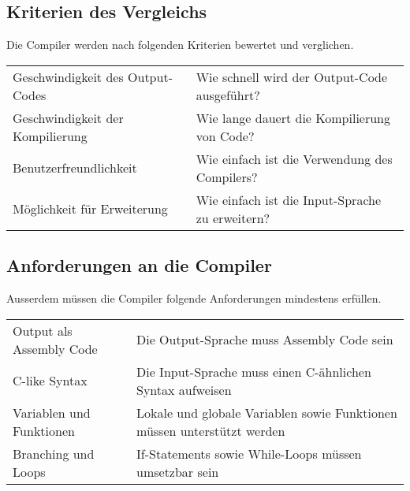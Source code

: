 \subsection{Kriterien des Vergleichs}
Die Compiler werden nach folgenden Kriterien bewertet und verglichen.

\begin{table}[h!]
    \begin{tabular}{l|l}
    Geschwindigkeit des Output-Codes    & Wie schnell wird der Output-Code ausgeführt?                      \\
    Geschwindigkeit der Kompilierung    & Wie lange dauert die Kompilierung von Code?                       \\
    Benutzerfreundlichkeit              & Wie einfach ist die Verwendung des Compilers?                     \\
    Möglichkeit für Erweiterung         & Wie einfach ist die Input-Sprache zu erweitern?                                 
    \end{tabular}
\end{table}

\subsection{Anforderungen an die Compiler}
Ausserdem müssen die Compiler folgende Anforderungen mindestens erfüllen.

\begin{table}[h]
    \begin{tabular}{l|l}
    Output als Assembly Code        & Die Output-Sprache muss Assembly Code sein                               \\
    C-like Syntax                   & Die Input-Sprache muss einen C-ähnlichen Syntax aufweisen                \\
    Variablen und Funktionen        & Lokale und globale Variablen sowie Funktionen müssen unterstützt werden  \\
    Branching und Loops             & If-Statements sowie While-Loops müssen umsetzbar sein                            
    \end{tabular}
\end{table}


